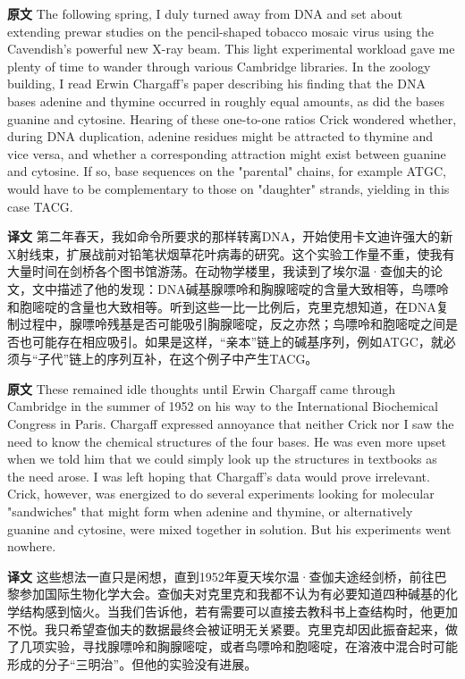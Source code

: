 \documentclass[UTF8,zihao=-4]{ctexart}
\newcommand{\BodyFont}{\fontsize{10.5pt}{15.5pt}\selectfont}
\renewenvironment{quote}{\par\noindent\begingroup\BodyFont}{\par\endgroup}
\begin{document}
\begin{quote}
\noindent\textbf{原文} The following spring, I duly turned away from DNA and set about extending prewar studies on the pencil-shaped tobacco mosaic virus using the Cavendish's powerful new X-ray beam. This light experimental workload gave me plenty of time to wander through various Cambridge libraries. In the zoology building, I read Erwin Chargaff's paper describing his finding that the DNA bases adenine and thymine occurred in roughly equal amounts, as did the bases guanine and cytosine. Hearing of these one-to-one ratios Crick wondered whether, during DNA duplication, adenine residues might be attracted to thymine and vice versa, and whether a corresponding attraction might exist between guanine and cytosine. If so, base sequences on the "parental" chains, for example ATGC, would have to be complementary to those on "daughter" strands, yielding in this case TACG.

\smallskip
\noindent\textbf{译文} 第二年春天，我如命令所要求的那样转离DNA，开始使用卡文迪许强大的新X射线束，扩展战前对铅笔状烟草花叶病毒的研究。这个实验工作量不重，使我有大量时间在剑桥各个图书馆游荡。在动物学楼里，我读到了埃尔温·查伽夫的论文，文中描述了他的发现：DNA碱基腺嘌呤和胸腺嘧啶的含量大致相等，鸟嘌呤和胞嘧啶的含量也大致相等。听到这些一比一比例后，克里克想知道，在DNA复制过程中，腺嘌呤残基是否可能吸引胸腺嘧啶，反之亦然；鸟嘌呤和胞嘧啶之间是否也可能存在相应吸引。如果是这样，“亲本”链上的碱基序列，例如ATGC，就必须与“子代”链上的序列互补，在这个例子中产生TACG。
\end{quote}

\begin{quote}
\noindent\textbf{原文} These remained idle thoughts until Erwin Chargaff came through Cambridge in the summer of 1952 on his way to the International Biochemical Congress in Paris. Chargaff expressed annoyance that neither Crick nor I saw the need to know the chemical structures of the four bases. He was even more upset when we told him that we could simply look up the structures in textbooks as the need arose. I was left hoping that Chargaff's data would prove irrelevant. Crick, however, was energized to do several experiments looking for molecular "sandwiches" that might form when adenine and thymine, or alternatively guanine and cytosine, were mixed together in solution. But his experiments went nowhere.

\smallskip
\noindent\textbf{译文} 这些想法一直只是闲想，直到1952年夏天埃尔温·查伽夫途经剑桥，前往巴黎参加国际生物化学大会。查伽夫对克里克和我都不认为有必要知道四种碱基的化学结构感到恼火。当我们告诉他，若有需要可以直接去教科书上查结构时，他更加不悦。我只希望查伽夫的数据最终会被证明无关紧要。克里克却因此振奋起来，做了几项实验，寻找腺嘌呤和胸腺嘧啶，或者鸟嘌呤和胞嘧啶，在溶液中混合时可能形成的分子“三明治”。但他的实验没有进展。
\end{quote}
\end{document}

